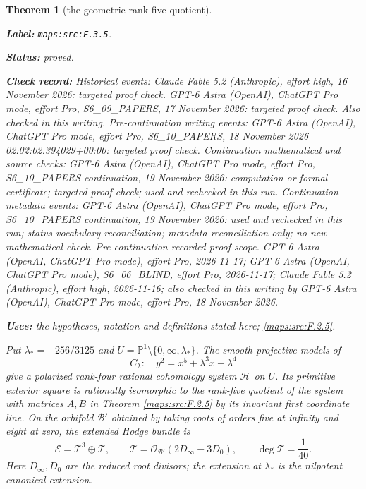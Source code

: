 \documentclass[11pt,a4paper]{article}
\newtheorem{theorem}{Theorem}[section]
\theoremstyle{definition}
\newcommand{\StatementRecord}[4]{\par\smallskip\begingroup\upshape\raggedright\noindent\textbf{Label:} \nolinkurl{#1}.\par\noindent\textbf{Status:} #2.\par\noindent\textbf{Check record:} #3.\par\noindent\textbf{Uses:} #4.\par\endgroup\smallskip}
\begin{document}
\begin{theorem}[the geometric rank-five quotient]\label{maps:src:F.3.5}
\StatementRecord{maps:src:F.3.5}{proved}{Historical events: Claude Fable 5.2 (Anthropic), effort high, 16 November 2026: targeted proof check. GPT-6 Astra (OpenAI), ChatGPT Pro mode, effort Pro, S6\_09\_PAPERS, 17 November 2026: targeted proof check. Also checked in this writing. Pre-continuation writing events: GPT-6 Astra (OpenAI), ChatGPT Pro mode, effort Pro, S6\_10\_PAPERS, 18 November 2026 02:02:02.394029+00:00: targeted proof check. Continuation mathematical and source checks: GPT-6 Astra (OpenAI), ChatGPT Pro mode, effort Pro, S6\_10\_PAPERS continuation, 19 November 2026: computation or formal certificate; targeted proof check; used and rechecked in this run. Continuation metadata events: GPT-6 Astra (OpenAI), ChatGPT Pro mode, effort Pro, S6\_10\_PAPERS continuation, 19 November 2026: used and rechecked in this run; status-vocabulary reconciliation; metadata reconciliation only; no new mathematical check. \emph{Pre-continuation recorded proof scope.} GPT-6 Astra (OpenAI, ChatGPT Pro mode), effort Pro, 2026-11-17; GPT-6 Astra (OpenAI, ChatGPT Pro mode), S6\_06\_BLIND, effort Pro, 2026-11-17; Claude Fable 5.2 (Anthropic), effort high, 2026-11-16; also checked in this writing by GPT-6 Astra (OpenAI), ChatGPT Pro mode, effort Pro, 18 November 2026}{the hypotheses, notation and definitions stated here; \cref{maps:src:F.2.5}}


Put $\lambda_*=-256/3125$ and
$U=\mathbb P^1\setminus\{0,\infty,\lambda_*\}$.  The smooth projective
models of
\[
 C_\lambda:\quad y^2=x^5+\lambda^3x+\lambda^4
 \tag{F.7}\label{maps:eq:F.7}
\]
give a polarized rank-four rational cohomology system $\mathcal H$ on
$U$.  Its primitive exterior square is rationally isomorphic to
the rank-five quotient of the system with matrices $A,B$ in
Theorem \ref{maps:src:F.2.5} by its invariant first coordinate line.
On the orbifold $\mathcal B'$ obtained by taking roots of orders
five at infinity and eight at zero, the extended Hodge bundle is
\[
 \mathcal E=\mathcal T^3\oplus\mathcal T,\qquad
 \mathcal T=\mathcal O_{\mathcal B'}(2D_\infty-3D_0),\qquad
 \deg\mathcal T=\frac1{40}.
 \tag{F.8}\label{maps:eq:F.8}
\]
Here $D_\infty,D_0$ are the reduced root divisors; the extension at
$\lambda_*$ is the nilpotent canonical extension.

\end{theorem}
\end{document}
